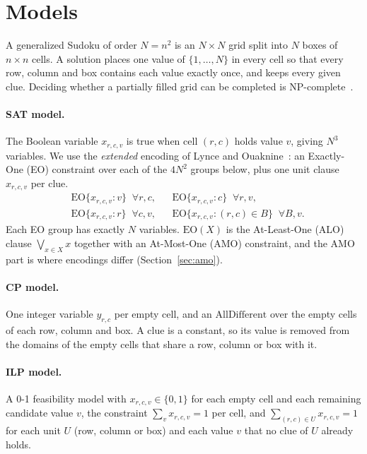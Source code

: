 \section{Models}\label{sec:models}

A generalized Sudoku of order $N=n^2$ is an $N\times N$ grid split into $N$ boxes of $n\times n$ cells. A solution places one value of $\{1,\dots,N\}$ in every cell so that every row, column and box contains each value exactly once, and keeps every given clue. Deciding whether a partially filled grid can be completed is NP-complete~\cite{yato2003}.

\paragraph{SAT model.} The Boolean variable $x_{r,c,v}$ is true when cell $(r,c)$ holds value $v$, giving $N^3$ variables. We use the \emph{extended} encoding of Lynce and Ouaknine~\cite{lynce2006}: an Exactly-One (EO) constraint over each of the $4N^2$ groups below, plus one unit clause $x_{r,c,v}$ per clue.
\begin{align}
&\mathrm{EO}\{x_{r,c,v} : v\} \;\; \forall r,c, &
&\mathrm{EO}\{x_{r,c,v} : c\} \;\; \forall r,v, \label{eq:eo1}\\
&\mathrm{EO}\{x_{r,c,v} : r\} \;\; \forall c,v, &
&\mathrm{EO}\{x_{r,c,v} : (r,c)\in B\} \;\; \forall B,v. \label{eq:eo2}
\end{align}
Each EO group has exactly $N$ variables. $\mathrm{EO}(X)$ is the At-Least-One (ALO) clause $\bigvee_{x\in X}x$ together with an At-Most-One (AMO) constraint, and the AMO part is where encodings differ (Section~\ref{sec:amo}).

\paragraph{CP model.} One integer variable $y_{r,c}$ per empty cell, and an $\mathrm{AllDifferent}$ over the empty cells of each row, column and box. A clue is a constant, so its value is removed from the domains of the empty cells that share a row, column or box with it.

\paragraph{ILP model.} A 0-1 feasibility model with $x_{r,c,v}\in\{0,1\}$ for each empty cell and each remaining candidate value $v$, the constraint $\sum_v x_{r,c,v}=1$ per cell, and $\sum_{(r,c)\in U} x_{r,c,v}=1$ for each unit $U$ (row, column or box) and each value $v$ that no clue of $U$ already holds.

